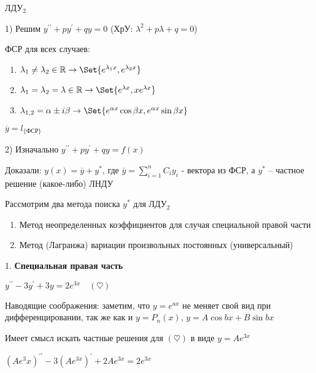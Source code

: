 \documentclass[12pt]{article}
\begin{document}
    \Mem ЛДУ$_2$

    1) Решим $y^{\prime\prime} + py^\prime + qy = 0$ (ХрУ: $\lambda^2 + p \lambda + q = 0$)

    ФСР для всех случаев:

    \begin{enumerate}
        \item $\lambda_1 \neq \lambda_2 \in \Real \to \Set{e^{\lambda_1 x}, e^{\lambda_2 x}}$

        \item $\lambda_1 = \lambda_2 = \lambda \in \Real \to \Set{e^{\lambda x}, xe^{\lambda x}}$

        \item $\lambda_{1,2} = \alpha \pm i \beta \to \Set{e^{\alpha x} \cos \beta x, e^{\alpha x} \sin \beta x}$
    \end{enumerate}

    $\overline{y} = l_{\{\text{ФСР}\}}$

    2) Изначально $y^{\prime\prime} + py^\prime + qy = f(x)$

    Доказали: $y(x) = \overline{y} + y^*$, где $\overline{y} = \sum_{i=1}^n C_i y_i$ - вектора из ФСР, а $y^*$ -- частное решение (какое-либо) ЛНДУ

    \Nota Рассмотрим два метода поиска $y^*$ для ЛДУ$_2$

    \begin{enumerate}
        \item Метод неопределенных коэффициентов для случая специальной правой части

        \item Метод (Лагранжа) вариации произвольных постоянных (универсальный)
    \end{enumerate}

    \mediumvspace

    \hypertarget{specialrightpart}{}

    1. \textbf{Специальная правая часть}

    \Ex $y^{\prime\prime} - 3y^\prime + 3y = 2e^{3x} \quad (\heartsuit)$

    Наводящие соображения: заметим, что $y = e^{ax}$ не меняет свой вид при дифференцировании,
    так же как и $y = P_n(x)$, $y = A\cos bx + B\sin bx$

    Имеет смысл искать частные решения для $(\heartsuit)$ в виде $y = Ae^{3x}$

    $(Ae^3x)^{\prime\prime} - 3(Ae^{3x})^\prime + 2Ae^{3x} = 2e^{3x}$
\end{document}
